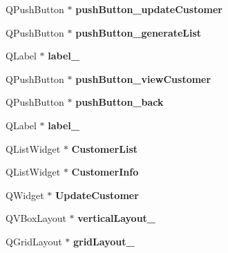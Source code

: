 \begin{DoxyCompactItemize}
\hypertarget{class_ui___main_window_a2295ddf43192ae3d4bcc1015743ce17c}{}\label{class_ui___main_window_a2295ddf43192ae3d4bcc1015743ce17c} 
Q\+Push\+Button $\ast$ {\bfseries push\+Button\+\_\+update\+Customer}
\item 
\hypertarget{class_ui___main_window_a77512f694ad64fe4b37d67701fbe5e16}{}\label{class_ui___main_window_a77512f694ad64fe4b37d67701fbe5e16} 
Q\+Push\+Button $\ast$ {\bfseries push\+Button\+\_\+generate\+List}
\item 
\hypertarget{class_ui___main_window_a0376fd90247280e7c7957cc70628708c}{}\label{class_ui___main_window_a0376fd90247280e7c7957cc70628708c} 
Q\+Label $\ast$ {\bfseries label\+\_}
\item 
\hypertarget{class_ui___main_window_a6014826a1217c48c0c0bb1a86dc6c10a}{}\label{class_ui___main_window_a6014826a1217c48c0c0bb1a86dc6c10a} 
Q\+Push\+Button $\ast$ {\bfseries push\+Button\+\_\+view\+Customer}
\item 
\hypertarget{class_ui___main_window_a111f7e700db9586e4cd1448036c2513e}{}\label{class_ui___main_window_a111f7e700db9586e4cd1448036c2513e} 
Q\+Push\+Button $\ast$ {\bfseries push\+Button\+\_\+back}
\item 
\hypertarget{class_ui___main_window_af183bfbfb9f38bbdd60caf92b15e23dc}{}\label{class_ui___main_window_af183bfbfb9f38bbdd60caf92b15e23dc} 
Q\+Label $\ast$ {\bfseries label\+\_}
\item 
\hypertarget{class_ui___main_window_aa43e1a0f9ed68685af0b2e3f09bd0302}{}\label{class_ui___main_window_aa43e1a0f9ed68685af0b2e3f09bd0302} 
Q\+List\+Widget $\ast$ {\bfseries Customer\+List}
\item 
\hypertarget{class_ui___main_window_a6596217de3ba71598a691362946589e6}{}\label{class_ui___main_window_a6596217de3ba71598a691362946589e6} 
Q\+List\+Widget $\ast$ {\bfseries Customer\+Info}
\item 
\hypertarget{class_ui___main_window_afa711e310621dd27692b6747ccfb72a0}{}\label{class_ui___main_window_afa711e310621dd27692b6747ccfb72a0} 
Q\+Widget $\ast$ {\bfseries Update\+Customer}
\item 
\hypertarget{class_ui___main_window_afcc20a3d5058037a00cdc6122f231848}{}\label{class_ui___main_window_afcc20a3d5058037a00cdc6122f231848} 
Q\+V\+Box\+Layout $\ast$ {\bfseries vertical\+Layout\+\_}
\item 
\hypertarget{class_ui___main_window_af42ea7d4c2e893181caad21e28166932}{}\label{class_ui___main_window_af42ea7d4c2e893181caad21e28166932} 
Q\+Grid\+Layout $\ast$ {\bfseries grid\+Layout\+\_}
\item 

\end{DoxyCompactItemize}
